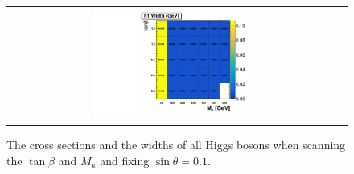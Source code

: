 \begin{figure}[htb]
\begin{tabular}{cc}
\includegraphics[width=0.49\textwidth]{2HDM/varytanbeta/sinp_0p1/MH750_MA500_MDM1/2HDMPZ2_h1width_varytanb_sinp0p1.pdf} \\
 \end{tabular}

  \caption{The cross sections and the widths of all Higgs bosons when scanning the $\tan\beta$ and $M_a$ and fixing 
 $\sin\theta=0.1$.}
  \label{fig:scantbwidthone}
\end{figure}


